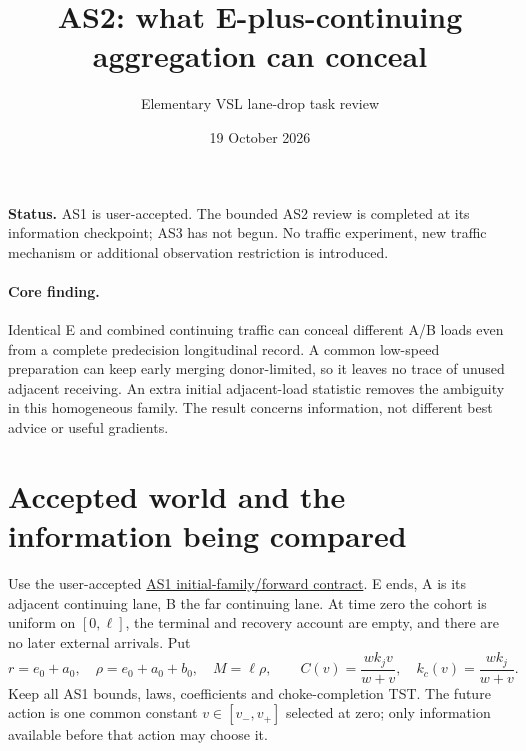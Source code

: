 \documentclass[11pt,a4paper]{article}
\title{AS2: what E-plus-continuing aggregation can conceal}
\author{Elementary VSL lane-drop task review}
\date{19 October 2026}
\newcommand{\kc}{k_c}
\begin{document}
\maketitle
\noindent\textbf{Status.} AS1 is user-accepted. The bounded AS2 review is
completed at its information checkpoint; AS3 has not begun.
No traffic experiment, new traffic mechanism or additional observation
restriction is introduced.

\paragraph{Core finding.}
Identical E and combined continuing traffic can conceal different A/B
loads even from a complete predecision longitudinal record. A common
low-speed preparation can keep early merging donor-limited, so it leaves
no trace of unused adjacent receiving. An extra initial adjacent-load
statistic removes the ambiguity in this homogeneous family. The result
concerns information, not different best advice or useful gradients.

\section{Accepted world and the information being compared}
Use the user-accepted
\href{vsl_as1_asymmetric_forward_contract.pdf}{AS1 initial-family/forward contract}.
E ends, A is its adjacent continuing lane, B the far continuing lane.
At time zero the cohort is uniform on $[0,\ell]$, the terminal and recovery
account are empty, and there are no later external arrivals. Put
\begin{equation}
 r=e_0+a_0,\quad \rho=e_0+a_0+b_0,\quad M=\ell\rho,
 \qquad C(v)=\frac{wk_jv}{w+v},\quad \kc(v)=\frac{wk_j}{w+v}.
 \label{eq:world}
\end{equation}
Keep all AS1 bounds, laws, coefficients and choke-completion TST.
The future action is one common constant $v\in[v_-,v_+]$ selected at zero;
only information available before that action may choose it.
\end{document}
